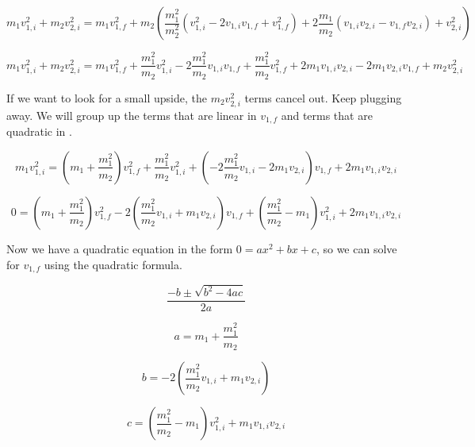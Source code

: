 \documentclass[12pt]{book}
\begin{document}
\begin{exampleblock}
\begin{equation}
m_1 v_{1,i}^2 + m_2 v_{2,i}^2 = m_1 v_{1,f}^2 + m_2 \left( \frac{m_1^2}{m_2^2}(v_{1,i}^2 - 2 v_{1,i} v_{1,f} + v_{1,f}^2) + 2 \frac{m_1}{m_2} (v_{1,i} v_{2,i} - v_{1,f} v_{2,i}) + v_{2,i}^2 \right)
\end{equation}

\begin{equation}
m_1 v_{1,i}^2 + m_2 v_{2,i}^2 = m_1 v_{1,f}^2 + \frac{m_1^2}{m_2} v_{1,i}^2 - 2 \frac{m_1^2}{m_2} v_{1,i} v_{1,f} + \frac{m_1^2}{m_2} v_{1,f}^2 + 2 m_1 v_{1,i} v_{2,i} - 2 m_1 v_{2,i} v_{1,f} + m_2 v_{2,i}^2
\end{equation}

If we want to look for a small upside, the $m_2 v_{2,i}^2$ terms cancel out. Keep plugging away. We will group up the terms that are linear in $v_{1,f}$ and terms that are quadratic in .

\begin{equation}
m_1 v_{1,i}^2 = \left( m_1 + \frac{m_1^2}{m_2} \right) v_{1,f}^2 + \frac{m_1^2}{m_2} v_{1,i}^2 + \left( -2 \frac{m_1^2}{m_2} v_{1,i} - 2 m_1 v_{2,i} \right) v_{1,f} + 2 m_1 v_{1,i} v_{2,i}
\end{equation}

\begin{equation}
0 = \left( m_1 + \frac{m_1^2}{m_2} \right) v_{1,f}^2 - 2 \left( \frac{m_1^2}{m_2} v_{1,i} + m_1 v_{2,i} \right) v_{1,f} + \left( \frac{m_1^2}{m_2} - m_1 \right) v_{1,i}^2 + 2 m_1 v_{1,i} v_{2,i}
\end{equation}

Now we have a quadratic equation in the form $0 = ax^2 + bx + c$, so we can solve for $v_{1,f}$ using the quadratic formula.

\begin{equation}
\frac{-b \pm \sqrt{b^2 - 4ac}}{2a}
\end{equation}

\begin{equation}
a = m_1 + \frac{m_1^2}{m_2} 
\end{equation}

\begin{equation}
b = -2 \left( \frac{m_1^2}{m_2} v_{1,i} + m_1 v_{2,i} \right)
\end{equation}

\begin{equation}
c = \left( \frac{m_1^2}{m_2} - m_1 \right) v_{1,i}^2 + m_1 v_{1,i} v_{2,i}
\end{equation}


\end{exampleblock}
\end{document}
